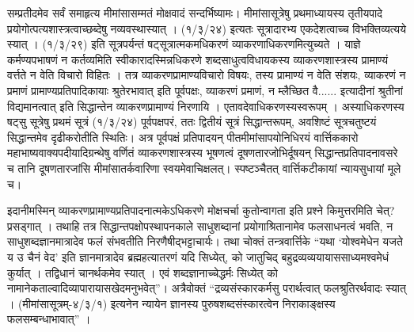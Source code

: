 सम्प्रतीदमेव सर्वं समाहृत्य मीमांसासम्मतं मोक्षवादं सन्दर्भिष्यामः। मीमांसासूत्रेषु प्रथमाध्यायस्य तृतीयपादे प्रयोगोत्पत्यशास्त्रत्वाच्छब्देषु नव्यवस्थास्यात् । (१/३/२४) इत्यतः सूत्रादारभ्य एकदेशत्वाच्च विभक्तिव्यत्यये स्यात् । (१/३/२९) इति सूत्रपर्यन्तं षट्सूत्रात्मकमधिकरणं व्याकरणाधिकरणमित्युच्यते ।  याज्ञे कर्मण्यपभाषणं न कर्तव्यमिति स्वीकारादस्मिन्नधिकरणे शब्दसाधुत्वविधायकस्य व्याकरणशास्त्रस्य प्रामाण्यं वर्त्तते न वेति विचारो विहितः । तत्र व्याकरणप्रामाण्यविचारो विषयः, तस्य प्रामाण्यं न वेति संशयः, व्याकरणं न प्रमाणं प्रामाण्यप्रतिपादिकायाः श्रुतेरभावात् इति पूर्वपक्षः, व्याकरणं प्रमाणं, न म्लैच्छित वै...... इत्यादीनां श्रुतीनां विद्यमानत्वात् इति सिद्धान्तेन व्याकरणप्रामाण्यं निरणायि । एतावदेवाधिकरणस्यस्वरूपम् । अस्याधिकरणस्य षट्सु सूत्रेषु प्रथमं सूत्रं (१/३/२४) पूर्वपक्षपरं, ततः द्वितीयं सूत्रं सिद्धान्तरूपम्, अवशिष्टं सूत्रचतुष्टयं सिद्धान्तमेव दृढीकरोतीति स्थितिः। अत्र पूर्वपक्षं प्रतिपादयन् पीतमीमांसापयोनिधिरयं वार्त्तिककारो महाभाष्यवाक्यपदीयादिग्रन्थेषु वर्णितं व्याकरणशास्त्रस्य भूषणत्वं दूषणतारजोभिर्दूषयन् सिद्धान्तप्रतिपादनावसरे च तानि दूषणतारजांसि मीमांसातर्कवारिणा स्वयमेवाचिक्षलत्। स्पष्टञ्चैतत् वार्त्तिकटीकायां न्यायसुधायां मूले च।

इदानीमस्मिन् व्याकरणप्रामाण्यप्रतिपादनात्मकेऽधिकरणे मोक्षचर्चा कुतोन्वागता इति प्रश्ने किमुत्तरमिति चेत्? प्रसड्गात् । तथाहि तत्र सिद्धान्तपक्षोपस्थापनकाले साधुशब्दानां प्रयोगाश्रितानामेव फलसाधनत्वं भवति, न साधुशब्दज्ञानमात्रादेव फलं संभवतीति निरणैषीद्भट्टाचार्यः। तथा चोक्तं तन्त्रवार्त्तिके “यथा ‘योश्वमेधेन यजते य उ चैनं वेद’ इति ज्ञानमात्रादेव ब्रह्महत्यातरणं यदि सिध्येत्, को जातुचिद् बहुद्रव्यव्ययायाससाध्यमश्वमेधं कुर्यात् । तद्विधानं चानर्थकमेव स्यात् । एवं शब्दज्ञानाच्चेद्धर्मः सिध्येत् को नामानेकताल्वादिव्यापारायासखेदमनुभवेत्”। अत्रैवोक्तं “द्रव्यसंस्कारकर्मसु परार्थत्वात् फलश्रुतिरर्थवादः स्यात् । (मीमांसासूत्रम्-४/३/१) इत्यनेन न्यायेन ज्ञानस्य पुरुषशब्दसंस्कारत्वेन निराकाङ्क्षस्य फलसम्बन्धाभावात्” । 

